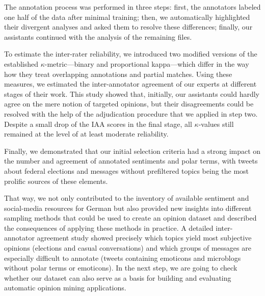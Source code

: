 The annotation process was performed in three steps: first, the
annotators labeled one half of the data after minimal training; then,
we automatically highlighted their divergent analyses and asked them
to resolve these differences; finally, our assistants continued with
the analysis of the remaining files.

To estimate the inter-rater reliability, we introduced two modified
versions of the established $\kappa$-metric---binary and proportional
kappa---which differ in the way how they treat overlapping annotations
and partial matches.  Using these measures, we estimated the
inter-annotator agreement of our experts at different stages of their
work.  This study showed that, initially, our assistants could hardly
agree on the mere notion of targeted opinions, but their disagreements
could be resolved with the help of the adjudication procedure that we
applied in step two.  Despite a small drop of the IAA scores in the
final stage, all $\kappa$-values still remained at the level of at
least moderate reliability.

Finally, we demonstrated that our initial selection criteria had a
strong impact on the number and agreement of annotated sentiments and
polar terms, with tweets about federal elections and messages without
prefiltered topics being the most prolific sources of these elements.

That way, we not only contributed to the inventory of available
sentiment and social-media resources for German but also provided new
insights into different sampling methods that could be used to create
an opinion dataset and described the consequences of applying these
methods in practice.  A detailed inter-annotator agreement study
showed precisely which topics yield most subjective opinions
(elections and casual conversations) and which groups of messages are
especially difficult to annotate (tweets containing emoticons and
microblogs without polar terms or emoticons).  In the next step, we
are going to check whether our dataset can also serve as a basis for
building and evaluating automatic opinion mining applications.
